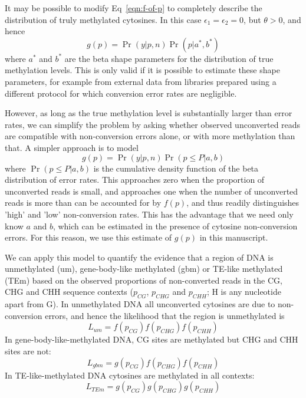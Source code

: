 \documentclass[10pt,draft,letterpaper]{article}
\begin{document}
It may be possible to modify Eq~\ref{eqn:f-of-p} to completely describe the distribution of truly methylated cytosines.
In this case $\epsilon_1=\epsilon_2=0$, but $\theta>0$, and hence
\begin{equation}
    g(p) = \Pr(y | p, n) \Pr(p | a^*,b^*)
\end{equation}
where $a^*$ and $b^*$ are the beta shape parameters for the distribution of true methylation levels.
This is only valid if it is possible to estimate these shape parameters, for example from external data from libraries prepared using a different protocol for which conversion error rates are negligible.

However, as long as the true methylation level is substantially larger than error rates, we can simplify the problem by asking whether observed unconverted reads are compatible with non-conversion errors alone, or with more methylation than that.
A simpler approach is to model 
\begin{equation}
    g(p) = \Pr(y | p, n) \Pr(p \leq P | a,b)
\end{equation}
where $\Pr(p \leq P | a,b)$ is the cumulative density function of the beta distribution of error rates.
This approaches zero when the proportion of unconverted reads is small, and approaches one when the number of unconverted reads is more than can be accounted for by $f(p)$, and thus readily distinguishes 'high' and 'low' non-conversion rates.
This has the advantage that we need only know $a$ and $b$, which can be estimated in the presence of cytosine non-conversion errors.
For this reason, we use this estimate of $g(p)$ in this manuscript.

We can apply this model to quantify the evidence that a region of DNA is unmethylated (um), gene-body-like methylated (gbm) or TE-like methylated (TEm) based on the observed proportions of non-converted reads in the CG, CHG and CHH sequence contexts ($p_{CG}$, $p_{CHG}$ and $p_{CHH}$; H is any nucleotide apart from G).
In unmethylated DNA all unconverted cytosines are due to non-conversion errors, and hence the likelihood that the region is unmethylated is
\begin{equation}
    L_{um} = f(p_{CG}) f(p_{CHG}) f(p_{CHH})
\end{equation}
In gene-body-like-methylated DNA, CG sites are methylated but CHG and CHH sites are not: 
\begin{equation}
    L_{gbm} = g(p_{CG}) f(p_{CHG}) f(p_{CHH})
\end{equation}
In TE-like-methylated DNA cytosines are methylated in all contexts:
\begin{equation}
    L_{TEm} = g(p_{CG}) g(p_{CHG}) g(p_{CHH})
\end{equation}
\end{document}
